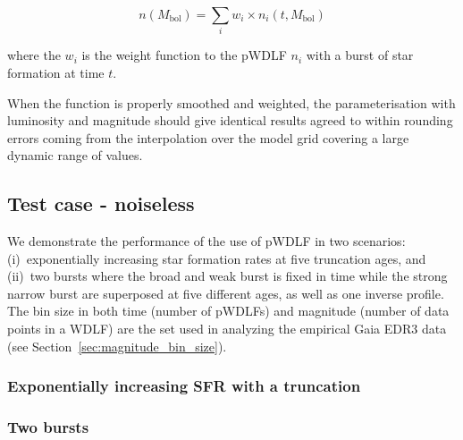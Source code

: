 \documentclass[fleqn,usenatbib]{mnras}
\begin{document}
\begin{equation}
    n(M_\mathrm{bol}) = \sum_i w_i \times n_i(t, M_\mathrm{bol})    
\end{equation}

where the $w_i$ is the weight function to the pWDLF $n_i$ with a
burst of star formation at time $t$.

When the function is properly smoothed and weighted, the
parameterisation with luminosity and magnitude should give identical
results agreed to within rounding errors coming from the interpolation
over the model grid covering a large dynamic range of values.

\subsection{Test case - noiseless}

We demonstrate the performance of the use of pWDLF in two scenarios:
(i)~exponentially increasing star formation rates at five truncation
ages, and (ii)~two bursts where the broad and weak burst is fixed in
time while the strong narrow burst are superposed at five different
ages, as well as one inverse profile. The bin size in both time (number
of pWDLFs) and magnitude (number of data points in a WDLF) are the set
used in analyzing the empirical Gaia EDR3 data (see 
Section~\ref{sec:magnitude_bin_size}).

\subsubsection*{Exponentially increasing SFR with a truncation}

\subsubsection*{Two bursts}
\end{document}

